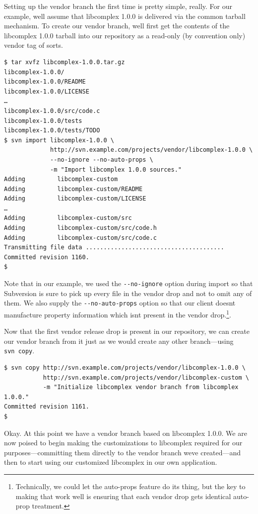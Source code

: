 Setting up the vendor branch the first time is pretty simple, really.
For our example, we\textquotesingle ll assume that libcomplex 1.0.0 is
delivered via the common tarball mechanism. To create our vendor branch,
we\textquotesingle ll first get the contents of the libcomplex 1.0.0
tarball into our repository as a read-only (by convention only) vendor
tag of sorts.

\begin{verbatim}
$ tar xvfz libcomplex-1.0.0.tar.gz
libcomplex-1.0.0/
libcomplex-1.0.0/README
libcomplex-1.0.0/LICENSE
…
libcomplex-1.0.0/src/code.c
libcomplex-1.0.0/tests
libcomplex-1.0.0/tests/TODO
$ svn import libcomplex-1.0.0 \
             http://svn.example.com/projects/vendor/libcomplex-1.0.0 \
             --no-ignore --no-auto-props \
             -m "Import libcomplex 1.0.0 sources."
Adding         libcomplex-custom
Adding         libcomplex-custom/README
Adding         libcomplex-custom/LICENSE
…
Adding         libcomplex-custom/src
Adding         libcomplex-custom/src/code.h
Adding         libcomplex-custom/src/code.c
Transmitting file data .......................................
Committed revision 1160.
$
\end{verbatim}

Note that in our example, we used the \texttt{-\/-no-ignore} option
during import so that Subversion is sure to pick up every file in the
vendor drop and not to omit any of them. We also supply the
\texttt{-\/-no-auto-props} option so that our client
doesn\textquotesingle t manufacture property information which
isn\textquotesingle t present in the vendor drop.\footnote{Technically,
  we could let the auto-props feature do its thing, but the key to
  making that work well is ensuring that each vendor drop gets identical
  auto-prop treatment.}.

Now that the first vendor release drop is present in our repository, we
can create our vendor branch from it just as we would create any other
branch---using \texttt{svn\ copy}.

\begin{verbatim}
$ svn copy http://svn.example.com/projects/vendor/libcomplex-1.0.0 \
           http://svn.example.com/projects/vendor/libcomplex-custom \
           -m "Initialize libcomplex vendor branch from libcomplex 1.0.0."
Committed revision 1161.
$
\end{verbatim}

Okay. At this point we have a vendor branch based on libcomplex 1.0.0.
We are now poised to begin making the customizations to libcomplex
required for our purposes---committing them directly to the vendor
branch we\textquotesingle ve created---and then to start using our
customized libcomplex in our own application.

